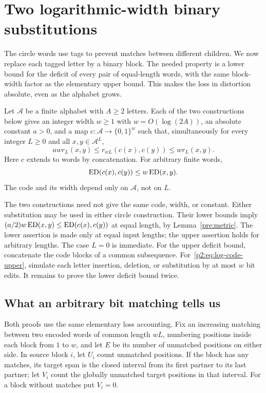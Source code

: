 \section{Two logarithmic-width binary substitutions}
\label{p2:sec:binary-coding}

The circle words use tags to prevent matches between different children.
We now replace each tagged letter by a binary block. The needed property is
a lower bound for the deficit of every pair of equal-length words, with the
same block-width factor as the elementary upper bound. This makes the loss
in distortion absolute, even as the alphabet grows.

\begin{theorem}\label{code:two-proofs}
Let $\mathcal A$ be a finite alphabet with $A\geq2$ letters. Each of the two
constructions below gives an integer width $w\geq1$ with $w=O(\log(2A))$, an absolute constant
$a>0$, and a map $c:\mathcal A\to\{0,1\}^w$ such that, simultaneously for
every integer $L\geq0$ and all $x,y\in\mathcal A^L$,
\begin{equation}\label{p2:eq:log-code-deficit}
 a w r_L(x,y)\leq r_{wL}(c(x),c(y))\leq w r_L(x,y).
\end{equation}
Here $c$ extends to words by concatenation. For arbitrary finite words,
\begin{equation}\label{p2:eq:log-code-upper}
 \operatorname{ED}(c(x),c(y))\leq w\operatorname{ED}(x,y).
\end{equation}
The code and its width depend only on $\mathcal A$, not on $L$.
\end{theorem}

The two constructions need not give the same code, width, or constant.
Either substitution may be used in either circle construction.
Their lower bounds imply $(a/2)w\operatorname{ED}(x,y)\leq\operatorname{ED}(c(x),c(y))$ at equal
length, by Lemma~\ref{pre:metric}. The lower assertion is made only at
equal input lengths; the upper assertion holds for arbitrary lengths.
The case $L=0$ is immediate. For the upper deficit bound, concatenate the
code blocks of a common subsequence. For~\eqref{p2:eq:log-code-upper},
simulate each letter insertion, deletion, or substitution by at most $w$
bit edits. It remains to prove the lower deficit bound twice.

\subsection{What an arbitrary bit matching tells us}
Both proofs use the same elementary loss accounting. Fix an increasing
matching between two encoded words of common length $wL$, numbering positions
inside each block from $1$ to $w$, and let $E$ be
its number of unmatched positions on either side. In source block $i$, let
$U_i$ count unmatched positions. If the block has any matches, its target
span is the closed interval from its first partner to its last partner;
let $V_i$ count the globally unmatched target positions in that interval.
For a block without matches put $V_i=0$.

